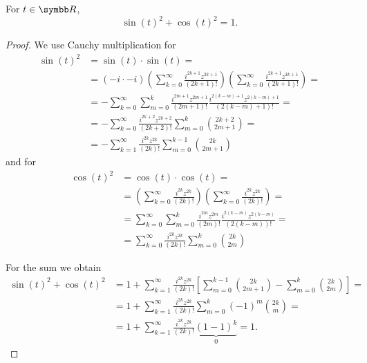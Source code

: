 \begin{proposition}\label{thm:pythagorean_identity}
  For \( t \in \BR \),
  \begin{equation*}
    \sin(t)^2 + \cos(t)^2 = 1.
  \end{equation*}
\end{proposition}
\begin{proof}
  We use Cauchy multiplication for
  \begin{align*}
    \sin(t)^2
    &=
    \sin(t) \cdot \sin(t)
    = \\ &=
    (-i \cdot -i) \left( \sum_{k=0}^\infty \frac {i^{2k+1} z^{2k+1}} {(2k+1)!} \right) \left( \sum_{k=0}^\infty \frac {i^{2k+1} z^{2k+1}} {(2k+1)!} \right)
    = \\ &=
    -\sum_{k=0}^\infty \sum_{m=0}^k \frac {i^{2m+1} z^{2m+1}} {(2m+1)!} \frac {i^{2(k-m)+1} z^{2(k-m)+1}} {(2(k-m)+1)!}
    = \\ &=
    -\sum_{k=0}^\infty \frac {i^{2k+2} z^{2k+2}} {(2k+2)!} \sum_{m=0}^k \binom {2k+2} {2m+1}
    = \\ &=
    -\sum_{k=1}^\infty \frac {i^{2k} z^{2k}} {(2k)!} \sum_{m=0}^{k-1} \binom {2k} {2m+1}
  \end{align*}
  and for
  \begin{align*}
    \cos(t)^2
    &=
    \cos(t) \cdot \cos(t)
    = \\ &=
    \left( \sum_{k=0}^\infty \frac {i^{2k} z^{2k}} {(2k)!} \right) \left( \sum_{k=0}^\infty \frac {i^{2k} z^{2k}} {(2k)!} \right)
    = \\ &=
    \sum_{k=0}^\infty \sum_{m=0}^k \frac {i^{2m} z^{2m}} {(2m)!} \frac {i^{2(k-m)} z^{2(k-m)}} {(2(k-m))!}
    = \\ &=
    \sum_{k=0}^\infty \frac {i^{2k} z^{2k}} {(2k)!} \sum_{m=0}^k \binom {2k} {2m}
  \end{align*}

  For the sum we obtain
  \begin{align*}
    \sin(t)^2 + \cos(t)^2
    &=
    1 + \sum_{k=1}^\infty \frac {i^{2k} z^{2k}} {(2k)!} \left[ \sum_{m=0}^{k-1} \binom {2k} {2m+1} - \sum_{m=0}^k \binom {2k} {2m} \right]
    = \\ &=
    1 + \sum_{k=1}^\infty \frac {i^{2k} z^{2k}} {(2k)!} \sum_{m=0}^k (-1)^m \binom {2k} m
    = \\ &=
    1 + \sum_{k=1}^\infty \frac {i^{2k} z^{2k}} {(2k)!} \underbrace{(1 - 1)^k}_0
    =
    1.
  \end{align*}
\end{proof}

